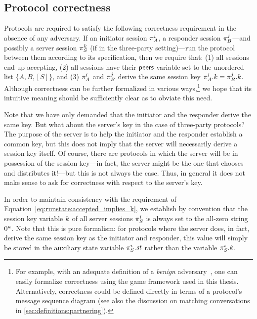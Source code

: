 \subsection{Protocol correctness}\label{sec:definitions:protocol_correctness}
Protocols are required to satisfy the following correctness requirement in the absence of any adversary.
If an initiator session $\oracle[A][i]$,
a responder session $\oracle[B][j]$---and possibly a server session $\oracle[S][k]$
(if in the three-party setting)---run 
the protocol between them according to its specification,
then we require that: (1) all sessions end up accepting,
(2) all sessions have their $\mathsf{peers}$ variable set to the unordered list $\lbrace A, B, [S] \rbrace$,
and (3) $\oracle[A][i]$ and $\oracle[B][j]$ derive the same session key $\oracle[A][i].\key = \oracle[B][j].\key$.
Although correctness can be further formalized in various ways,\footnote{For example,
with an adequate definition of a \emph{benign} adversary~\cite{STOC:BelRog95},
one can easily formalize correctness using the game framework used in this thesis.
Alternatively,
correctness could be defined directly in terms of a protocol's message sequence diagram
(see also the discussion on matching conversations in \cref{sec:definitions:partnering}).
}
we hope that its intuitive meaning should be sufficiently clear as to obviate this need.

 
Note that we have only demanded that the initiator and the responder derive the same key.
But what about the server's key in the case of three-party protocols?
The purpose of the server is to help the initiator and the responder establish a common key,
but this does not imply that the server will necessarily derive a session key itself.
Of course,
there are protocols in which the server will be in possession of the session key---in fact,
the server might be the one that chooses and distributes it!---but this is not always the case.
Thus, in general it does not make sense to ask for correctness with respect to the server's key.

In order to maintain consistency with the requirement of Equation~\eqref{eq:runstate:accepted_implies_k},
we establish by convention that the session key variable $k$ of all server sessions $\oracle[S][i]$ is always set to the all-zero string $0^\kappa$.
Note that this is pure formalism:
for protocols where the server does,
in fact,
derive the same session key as the initiator and responder,
this value will simply be stored in the auxiliary state variable $\oracle[S][i].\st$ rather than the variable $\oracle[S][i].\key$. 



